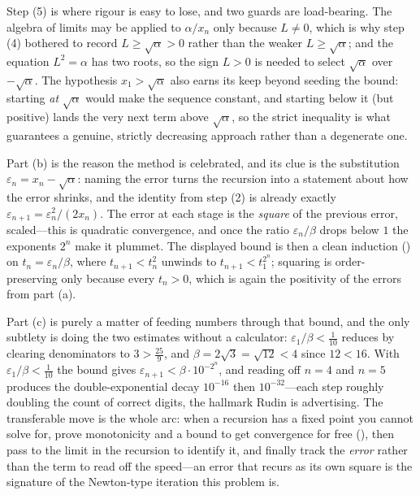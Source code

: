 \documentclass[main.tex]{subfiles}
\begin{document}
\begin{Reflection}
Step (5) is where rigour is easy to lose, and two guards are load-bearing. The algebra of limits may be
applied to $\alpha/x_n$ only because $L\neq0$, which is why step (4) bothered to record $L\ge\sqrt\alpha
>0$ rather than the weaker $L\ge\sqrt\alpha$; and the equation $L^2=\alpha$ has two roots, so the sign
$L>0$ is needed to select $\sqrt\alpha$ over $-\sqrt\alpha$. The hypothesis $x_1>\sqrt\alpha$ also earns
its keep beyond seeding the bound: starting \emph{at} $\sqrt\alpha$ would make the sequence constant, and
starting below it (but positive) lands the very next term above $\sqrt\alpha$, so the strict inequality
is what guarantees a genuine, strictly decreasing approach rather than a degenerate one.

Part (b) is the reason the method is celebrated, and its clue is the substitution $\varepsilon_n=x_n-
\sqrt\alpha$: naming the error turns the recursion into a statement about how the error shrinks, and the
identity from step (2) is already exactly $\varepsilon_{n+1}=\varepsilon_n^2/(2x_n)$. The error at each
stage is the \emph{square} of the previous error, scaled---this is quadratic convergence, and once the
ratio $\varepsilon_n/\beta$ drops below $1$ the exponents $2^n$ make it plummet. The displayed bound is
then a clean induction () on $t_n=\varepsilon_n/\beta$, where $t_{n+1}<t_n^2$ unwinds to
$t_{n+1}<t_1^{2^n}$; squaring is order-preserving only because every $t_n>0$, which is again the
positivity of the errors from part (a).

Part (c) is purely a matter of feeding numbers through that bound, and the only subtlety is doing the
two estimates without a calculator: $\varepsilon_1/\beta<\tfrac1{10}$ reduces by clearing denominators to
$3>\tfrac{25}9$, and $\beta=2\sqrt3=\sqrt{12}<4$ since $12<16$. With $\varepsilon_1/\beta<\tfrac1{10}$ the
bound gives $\varepsilon_{n+1}<\beta\cdot10^{-2^n}$, and reading off $n=4$ and $n=5$ produces the
double-exponential decay $10^{-16}$ then $10^{-32}$---each step roughly doubling the count of correct
digits, the hallmark Rudin is advertising. The transferable move is the whole arc: when a recursion has a
fixed point you cannot solve for, prove monotonicity and a bound to get convergence for free
(), then pass to the limit in the recursion to identify it,
and finally track the \emph{error} rather than the term to read off the speed---an error that recurs as
its own square is the signature of the Newton-type iteration this problem is.
\end{Reflection}
\end{document}
